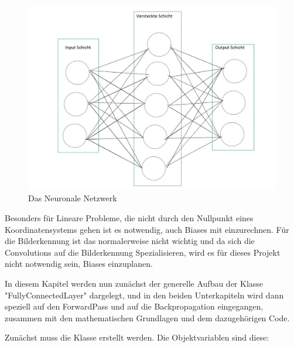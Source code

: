 \documentclass[12pt]{article}
\begin{document}
\begin{figure}[H]
\centering
\includegraphics[scale=0.50]{./Images/BA_002_FeedForwardNetzwerk.jpg}
\caption{Das Neuronale Netzwerk}
\label{Das Neuronale Netzwerk}
\end{figure}

Besonders für Lineare Probleme, die nicht durch den Nullpunkt eines Koordinatensystems gehen ist es notwendig, auch Biases mit einzurechnen. Für die Bilderkennung ist das normalerweise nicht wichtig und da sich die Convolutions auf die Bilderkennung Spezialisieren, wird es für dieses Projekt nicht notwendig sein, Biases einzuplanen.

In diesem Kapitel werden nun zunächst der generelle Aufbau der Klasse "FullyConnectedLayer" dargelegt, und in den beiden Unterkapiteln wird dann speziell auf den ForwardPass und auf die Backpropagation eingegangen, zusammen mit den mathematischen Grundlagen und dem dazugehörigen Code.

Zunächst muss die Klasse erstellt werden. Die Objektvariablen sind diese:
    
\end{document}
